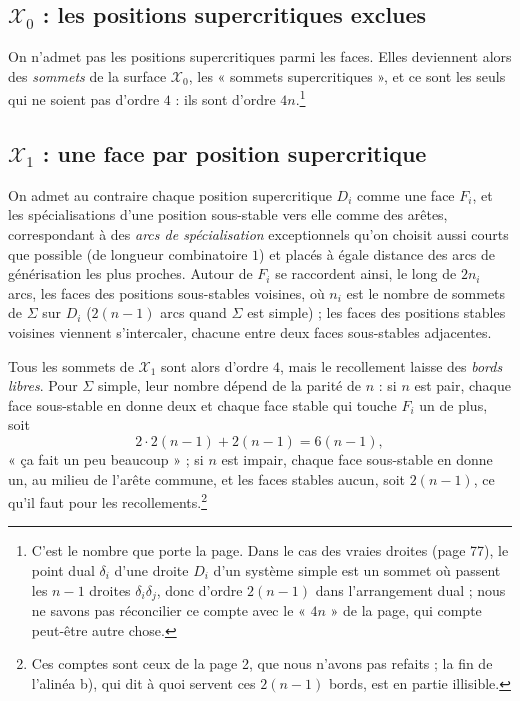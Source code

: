 \documentclass[11pt,a4paper]{article}
\begin{document}
\subsection*{$\mathcal{X}_0$ : les positions supercritiques exclues}

On n'admet pas les positions supercritiques parmi les faces. Elles deviennent
alors des \emph{sommets} de la surface $\mathcal{X}_0$, les « sommets
supercritiques », et ce sont les seuls qui ne soient pas d'ordre $4$ : ils sont
d'ordre $4n$.\footnote{C'est le nombre que porte la page. Dans le cas des vraies
droites (page 77), le point dual $\delta_i$ d'une droite $D_i$ d'un système
simple est un sommet où passent les $n - 1$ droites $\delta_i\delta_j$, donc
d'ordre $2(n-1)$ dans l'arrangement dual ; nous ne savons pas réconcilier ce
compte avec le « $4n$ » de la page, qui compte peut-être autre chose.}

\subsection*{$\mathcal{X}_1$ : une face par position supercritique}

On admet au contraire chaque position supercritique $D_i$ comme une face $F_i$,
et les spécialisations d'une position sous-stable vers elle comme des arêtes,
correspondant à des \emph{arcs de spécialisation} exceptionnels qu'on choisit
aussi courts que possible (de longueur combinatoire $1$) et placés à égale
distance des arcs de générisation les plus proches. Autour de $F_i$ se
raccordent ainsi, le long de $2n_i$ arcs, les faces des positions sous-stables
voisines, où $n_i$ est le nombre de sommets de $\Sigma$ sur $D_i$ ($2(n-1)$
arcs quand $\Sigma$ est simple) ; les faces des positions stables voisines
viennent s'intercaler, chacune entre deux faces sous-stables adjacentes.

Tous les sommets de $\mathcal{X}_1$ sont alors d'ordre $4$, mais le recollement
laisse des \emph{bords libres}. Pour $\Sigma$ simple, leur nombre dépend de la
parité de $n$ : si $n$ est pair, chaque face sous-stable en donne deux et chaque
face stable qui touche $F_i$ un de plus, soit
\[
2 \cdot 2(n-1) + 2(n-1) = 6(n-1),
\]
« ça fait un peu beaucoup » ; si $n$ est impair, chaque face sous-stable en
donne un, au milieu de l'arête commune, et les faces stables aucun, soit
$2(n-1)$, ce qu'il faut pour les recollements.\footnote{Ces comptes
sont ceux de la page 2, que nous n'avons pas refaits ; la fin de l'alinéa b),
qui dit à quoi servent ces $2(n-1)$ bords, est en partie illisible.}
\end{document}
